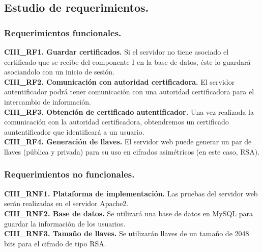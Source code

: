 \documentclass[12pt, a4paper, titlepage]{report}
\begin{document}
	        \subsection{Estudio de requerimientos.}
	            \subsubsection{Requerimientos funcionales.}
	            \textbf{CIII\_RF1. Guardar certificados.} Si el servidor no tiene asociado el certificado que se recibe del componente I en la base de datos, éste lo guardará asociandolo con un inicio de sesión.\\
	            
	            \textbf{CIII\_RF2. Comunicación con autoridad certificadora.} El servidor autentificador podrá tener comunicación con una autoridad certificadora para el intercambio de información.\\
	                
	            \textbf{CIII\_RF3. Obtención de certificado autentificador.} Una vez realizada la comunicación con la autoridad certificadora, obtendremos un certificado auntentificador que identificará a un usuario.\\
	            
	            
	            \textbf{CIII\_RF4. Generación de llaves.} El servidor web puede generar un par de llaves (pública y privada) para su uso en cifrados asimétricos (en este caso, RSA).\\
	       
	            \subsubsection{Requerimientos no funcionales.}
	                \textbf{CIII\_RNF1. Plataforma de implementación.} Las pruebas del servidor web serán realizadas en el servidor Apache2.\\

	                \textbf{CIII\_RNF2. Base de datos.} Se utilizará una base de datos en MySQL para guardar la información de los usuarios.\\
	                
	                \textbf{CIII\_RNF3. Tamaño de llaves.} Se utilizarán llaves de un tamaño de 2048 bits para el cifrado de tipo RSA.\\
	                
\end{document}
